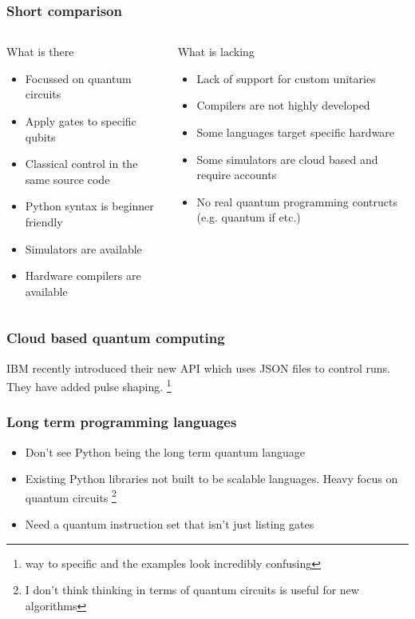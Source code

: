 \documentclass{beamer}
\begin{document}
\begin{frame}
\frametitle{Short comparison}
\begin{columns}
    \begin{block}{What is there}
    \begin{itemize}
        \item Focussed on quantum circuits
        \item Apply gates to specific qubits
        \item Classical control in the same source code
        \item Python syntax is beginner friendly
        \item Simulators are available
        \item Hardware compilers are available
    \end{itemize}
    \end{block}
    \begin{block}{What is lacking}
        \begin{itemize}
            \item Lack of support for custom unitaries
            \item Compilers are not highly developed
            \item Some languages target specific hardware
            \item Some simulators are cloud based and require accounts
            \item No real quantum programming contructs (e.g. quantum if etc.)
        \end{itemize}
        \end{block}
\end{columns}
\end{frame}

\begin{frame}
    \frametitle{Cloud based quantum computing}
    IBM recently introduced their new API \cite{mckay2018qiskit} which uses JSON files to control runs. They have
added pulse shaping. \footnote{way to specific and the examples look incredibly confusing} 

\end{frame}
\begin{frame}
\frametitle{Long term programming languages}
\begin{itemize} 
    \item Don't see Python being the long term quantum language 
    \item Existing Python libraries not built to be scalable languages. Heavy focus on
        quantum circuits \footnote{I don't think thinking in terms of quantum circuits is
        useful for new algorithms}
    \item Need a quantum instruction set that isn't just listing gates
\end{itemize}
\end{frame}
\end{document}
